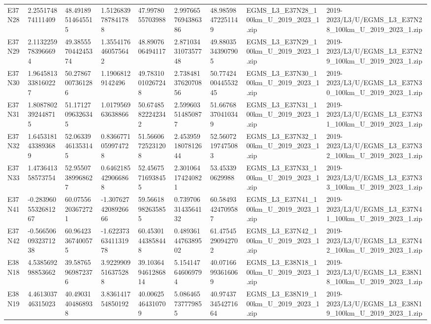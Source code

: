 \begin{landscape}
\begin{longtable}{lllllllll}
E37N28 & 2.255174874111409 & 48.49189514645515 & 1.5126839787841788 & 47.9978055703988 & 2.9976657694386386 & 48.98598472251149 & EGMS\_L3\_E37N28\_100km\_U\_2019\_2023\_1.zip & 2019-2023/L3/U/EGMS\_L3\_E37N28\_100km\_U\_2019\_2023\_1.zip \\
E37N29 & 2.1132259783966694 & 49.385557044245374 & 1.3554176460575642 & 48.8907606494117 & 2.8710343107357748 & 49.88035343907905 & EGMS\_L3\_E37N29\_100km\_U\_2019\_2023\_1.zip & 2019-2023/L3/U/EGMS\_L3\_E37N29\_100km\_U\_2019\_2023\_1.zip \\
E37N30 & 1.9645813338160227 & 50.27867007361286 & 1.19068129142496 & 49.78310010267248 & 2.7384813762070856 & 50.774240044553245 & EGMS\_L3\_E37N30\_100km\_U\_2019\_2023\_1.zip & 2019-2023/L3/U/EGMS\_L3\_E37N30\_100km\_U\_2019\_2023\_1.zip \\
E37N31 & 1.8087802392448715 & 51.17127096326345 & 1.017956963638866 & 50.67485822242342 & 2.599603514850877 & 51.66768370410349 & EGMS\_L3\_E37N31\_100km\_U\_2019\_2023\_1.zip & 2019-2023/L3/U/EGMS\_L3\_E37N31\_100km\_U\_2019\_2023\_1.zip \\
E37N32 & 1.6453181433893689 & 52.06339461353145 & 0.8366771059974728 & 51.56606725231208 & 2.4539591807812644 & 52.56072197475083 & EGMS\_L3\_E37N32\_100km\_U\_2019\_2023\_1.zip & 2019-2023/L3/U/EGMS\_L3\_E37N32\_100km\_U\_2019\_2023\_1.zip \\
E37N33 & 1.473641358573754 & 52.95507389968627 & 0.6462185429066868 & 52.45675716938455 & 2.301064174240821 & 53.453390629988 & EGMS\_L3\_E37N33\_100km\_U\_2019\_2023\_1.zip & 2019-2023/L3/U/EGMS\_L3\_E37N33\_100km\_U\_2019\_2023\_1.zip \\
E37N41 & -0.2839605532681267 & 60.07556203672721 & -1.3076274208926666 & 59.56618982635855 & 0.7397063143564132 & 60.58493424709587 & EGMS\_L3\_E37N41\_100km\_U\_2019\_2023\_1.zip & 2019-2023/L3/U/EGMS\_L3\_E37N41\_100km\_U\_2019\_2023\_1.zip \\
E37N42 & -0.5665060932371238 & 60.96423367400575 & -1.6223736341131978 & 60.45301443858448 & 0.4893614476389502 & 61.47545290942702 & EGMS\_L3\_E37N42\_100km\_U\_2019\_2023\_1.zip & 2019-2023/L3/U/EGMS\_L3\_E37N42\_100km\_U\_2019\_2023\_1.zip \\
E38N18 & 4.538569298853662 & 39.58765969872376 & 3.9229909516375288 & 39.103649461286814 & 5.154147646069794 & 40.07166993616069 & EGMS\_L3\_E38N18\_100km\_U\_2019\_2023\_1.zip & 2019-2023/L3/U/EGMS\_L3\_E38N18\_100km\_U\_2019\_2023\_1.zip \\
E38N19 & 4.461303746315023 & 40.49031404868938 & 3.836141754850192 & 40.00625464310709 & 5.086465737779855 & 40.974373454271664 & EGMS\_L3\_E38N19\_100km\_U\_2019\_2023\_1.zip & 2019-2023/L3/U/EGMS\_L3\_E38N19\_100km\_U\_2019\_2023\_1.zip \\

\end{longtable}
\end{landscape}
